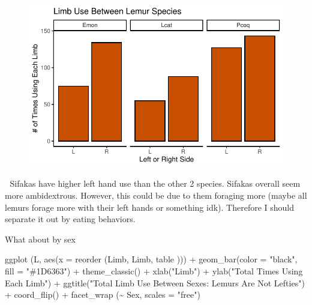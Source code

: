 \documentclass[
  letterpaper,
  DIV=11,
  numbers=noendperiod]{scrartcl}
\newenvironment{Shaded}{\begin{snugshade}}{\end{snugshade}}
\newcommand{\AttributeTok}[1]{\textcolor[rgb]{0.40,0.45,0.13}{#1}}
\newcommand{\FunctionTok}[1]{\textcolor[rgb]{0.28,0.35,0.67}{#1}}
\newcommand{\NormalTok}[1]{\textcolor[rgb]{0.00,0.23,0.31}{#1}}
\newcommand{\SpecialCharTok}[1]{\textcolor[rgb]{0.37,0.37,0.37}{#1}}
\newcommand{\StringTok}[1]{\textcolor[rgb]{0.13,0.47,0.30}{#1}}
\begin{document}
\begin{figure}[H]

{\centering \includegraphics{LeftyLemurs_files/figure-pdf/unnamed-chunk-19-1.pdf}

}

\end{figure}

👀 Sifakas have higher left hand use than the other 2 species. Sifakas
overall seem more ambidextrous. However, this could be due to them
foraging more (maybe all lemurs forage more with their left hands or
something idk). Therefore I should separate it out by eating behaviors.

What about by sex

\begin{Shaded}
\begin{Highlighting}[]
\FunctionTok{ggplot}\NormalTok{ (L, }\FunctionTok{aes}\NormalTok{(}\AttributeTok{x =} \FunctionTok{reorder}\NormalTok{ (Limb, Limb, table ))) }\SpecialCharTok{+}
  \FunctionTok{geom\_bar}\NormalTok{(}\AttributeTok{color =} \StringTok{"black"}\NormalTok{, }\AttributeTok{fill =} \StringTok{"\#1D6363"}\NormalTok{) }\SpecialCharTok{+}
  \FunctionTok{theme\_classic}\NormalTok{() }\SpecialCharTok{+}
  \FunctionTok{xlab}\NormalTok{(}\StringTok{"Limb"}\NormalTok{) }\SpecialCharTok{+}
  \FunctionTok{ylab}\NormalTok{(}\StringTok{"Total Times Using Each Limb"}\NormalTok{) }\SpecialCharTok{+}
  \FunctionTok{ggtitle}\NormalTok{(}\StringTok{"Total Limb Use Between Sexes: Lemurs Are Not Lefties"}\NormalTok{) }\SpecialCharTok{+}
  \FunctionTok{coord\_flip}\NormalTok{() }\SpecialCharTok{+}
  \FunctionTok{facet\_wrap}\NormalTok{ (}\SpecialCharTok{\textasciitilde{}}\NormalTok{ Sex, }\AttributeTok{scales =} \StringTok{"free"}\NormalTok{)}
\end{Highlighting}
\end{Shaded}
\end{document}
